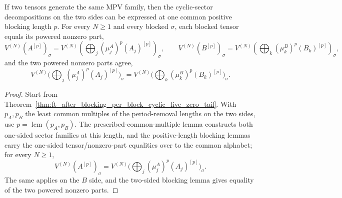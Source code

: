 \begin{theorem}%
    \label{thm:ft_after_blocking_common_length_common_sector_theorem}
    \leanok
    If two tensors generate the same MPV family, then the cyclic-sector
    decompositions on the two sides can be expressed at one common positive
    blocking length $p$. For every $N\ge 1$ and every blocked $\sigma$, each
    blocked tensor equals its powered nonzero part,
    \[
        V^{(N)}\!(A^{[p]})_\sigma
        =
        V^{(N)}\!(\textstyle\bigoplus_j (\mu^A_j)^p (A_j)^{[p]})_\sigma,
        \qquad
        V^{(N)}\!(B^{[p]})_\sigma
        =
        V^{(N)}\!(\textstyle\bigoplus_k (\mu^B_k)^p (B_k)^{[p]})_\sigma,
    \]
    and the two powered nonzero parts agree,
    \[
        V^{(N)}\!\bigl(\textstyle\bigoplus_j
        (\mu^A_j)^p (A_j)^{[p]}\bigr)_\sigma
        =
        V^{(N)}\!\bigl(\textstyle\bigoplus_k
        (\mu^B_k)^p (B_k)^{[p]}\bigr)_\sigma.
    \]
\end{theorem}

\begin{proof}\leanok
    Start from
    Theorem~\ref{thm:ft_after_blocking_per_block_cyclic_live_zero_tail}. With
    $p_A,p_B$ the least common multiples of the period-removal lengths on the two
    sides, use $p=\operatorname{lcm}(p_A,p_B)$. The prescribed-common-multiple
    lemma constructs both one-sided sector families at this length, and the
    positive-length blocking lemmas carry the one-sided tensor/nonzero-part
    equalities over to the common alphabet; for every $N\ge 1$,
    \[
        V^{(N)}\!(A^{[p]})_\sigma
        =
        V^{(N)}\!\bigl(\textstyle\bigoplus_j
        (\mu^A_j)^p (A_j)^{[p]}\bigr)_\sigma.
    \]
    The same applies on the $B$ side, and the two-sided blocking lemma gives
    equality of the two powered nonzero parts.
\end{proof}

